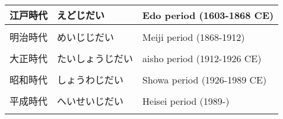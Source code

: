 \documentclass{article}
\begin{document}
\begin{tabular}{ l | l | p{10.5cm} }
江戸時代		&えどじだい			&Edo period (1603-1868 CE) \\ \hline \\[-1em]
明治時代		&めいじじだい		&Meiji period (1868-1912) \\ \hline \\[-1em]
大正時代		&たいしょうじだい		&aisho period (1912-1926 CE) \\ \hline \\[-1em]
昭和時代		&しょうわじだい		&Showa period (1926-1989 CE) \\ \hline \\[-1em]
平成時代		&へいせいじだい		&Heisei period (1989-) \\ \hline \\[-1em]

\end{tabular} \\ \\ \\ \\
\end{document}

